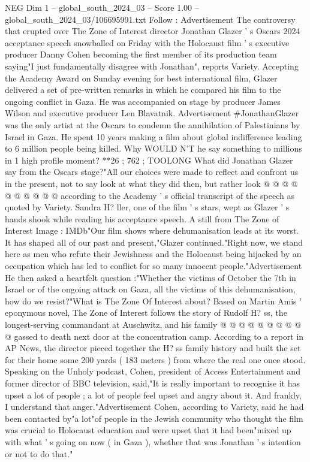 \begin{textsample}{NEG Dim 1 – global\_south\_2024\_03 – Score 1.00 – global\_south\_2024\_03/106695991.txt}  \label{ex:f1_neg_433}
Follow : Advertisement The controversy that erupted over The Zone of Interest director Jonathan Glazer ' s Oscars 2024 acceptance speech snowballed on Friday with the Holocaust film ' s executive producer Danny Cohen becoming the first member of its production team saying"I just fundamentally disagree with Jonathan", reports Variety.
Accepting the Academy Award on Sunday evening for best international film, Glazer delivered a set of pre-written remarks in which he compared his film to the ongoing conflict in Gaza.
He was accompanied on stage by producer James Wilson and executive producer Len Blavatnik.
Advertisement \#JonathanGlazer was the only artist at the Oscars to condemn the annihilation of Palestinians by Israel in Gaza.
He spent 10 years making a film about global indifference leading to 6 million people being killed.
Why WOULD N'T he say something to millions in 1 high profile moment? **26 ; 762 ; TOOLONG What did Jonathan Glazer say from the Oscars stage?"All our choices were made to reflect and confront us in the present, not to say look at what they did then, but rather look @ @ @ @ @ @ @ @ @ @ according to the Academy ' s official transcript of the speech as quoted by Variety.
Sandra H? ller, one of the film ' s stars, wept as Glazer ' s hands shook while reading his acceptance speech.
A still from The Zone of Interest Image : IMDb"Our film shows where dehumanisation leads at its worst.
It has shaped all of our past and present,"Glazer continued."Right now, we stand here as men who refute their Jewishness and the Holocaust being hijacked by an occupation which has led to conflict for so many innocent people."Advertisement He then asked a heartfelt question :"Whether the victims of October the 7th in Israel or of the ongoing attack on Gaza, all the victims of this dehumanisation, how do we resist?"What is The Zone Of Interest about?
Based on Martin Amis ' eponymous novel, The Zone of Interest follows the story of Rudolf H? ss, the longest-serving commandant at Auschwitz, and his family @ @ @ @ @ @ @ @ @ @ gassed to death next door at the concentration camp.
According to a report in AP News, the director pieced together the H? ss family history and built the set for their home some 200 yards ( 183 meters ) from where the real one once stood.
Speaking on the Unholy podcast, Cohen, president of Access Entertainment and former director of BBC television, said,"It is really important to recognise it has upset a lot of people ; a lot of people feel upset and angry about it.
And frankly, I understand that anger."Advertisement Cohen, according to Variety, said he had been contacted by"a lot"of people in the Jewish community who thought the film was crucial to Holocaust education and were upset that it had been"mixed up with what ' s going on now ( in Gaza ), whether that was Jonathan ' s intention or not to do that."

\end{textsample}
